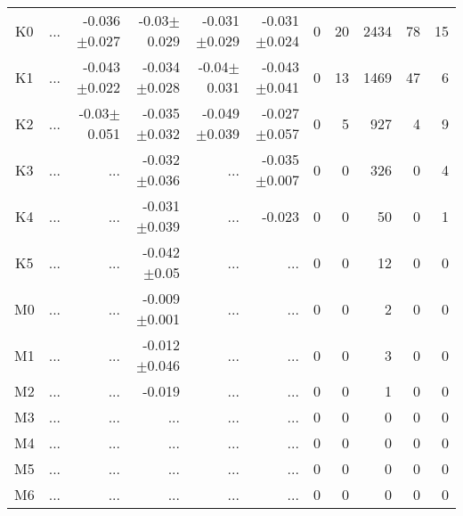 \begin{table}[t]
\begin{center}
\begin{tabular}{c|rrrrr|rrrrr}
K0	&	 ...	&	-0.036$\pm$0.027	&	-0.03$\pm$0.029	&	-0.031$\pm$0.029	&	-0.031$\pm$0.024	&	0	&	20	&	2434	&	78	&	15	\\
K1	&	 ...	&	-0.043$\pm$0.022	&	-0.034$\pm$0.028	&	-0.04$\pm$0.031	&	-0.043$\pm$0.041	&	0	&	13	&	1469	&	47	&	6	\\
K2	&	 ...	&	-0.03$\pm$0.051	&	-0.035$\pm$0.032	&	-0.049$\pm$0.039	&	-0.027$\pm$0.057	&	0	&	5	&	927	&	4	&	9	\\
K3	&	 ...	&	 ...	&	-0.032$\pm$0.036	&	 ...	&	-0.035$\pm$0.007	&	0	&	0	&	326	&	0	&	4	\\
K4	&	 ...	&	 ...	&	-0.031$\pm$0.039	&	 ...	&	-0.023	&	0	&	0	&	50	&	0	&	1	\\
K5	&	 ...	&	 ...	&	-0.042$\pm$0.05	&	 ...	&	 ...	&	0	&	0	&	12	&	0	&	0	\\
M0	&	 ...	&	 ...	&	-0.009$\pm$0.001	&	 ...	&	 ...	&	0	&	0	&	2	&	0	&	0	\\
M1	&	 ...	&	 ...	&	-0.012$\pm$0.046	&	 ...	&	 ...	&	0	&	0	&	3	&	0	&	0	\\
M2	&	 ...	&	 ...	&	-0.019	&	 ...	&	 ...	&	0	&	0	&	1	&	0	&	0	\\
M3	&	 ...	&	 ...	&	 ...	&	 ...	&	 ...	&	0	&	0	&	0	&	0	&	0	\\
M4	&	 ...	&	 ...	&	 ...	&	 ...	&	 ...	&	0	&	0	&	0	&	0	&	0	\\
M5	&	 ...	&	 ...	&	 ...	&	 ...	&	 ...	&	0	&	0	&	0	&	0	&	0	\\
M6	&	 ...	&	 ...	&	 ...	&	 ...	&	 ...	&	0	&	0	&	0	&	0	&	0	\\
    \bottomrule
    \end{tabular}
\end{center}
\end{table}



